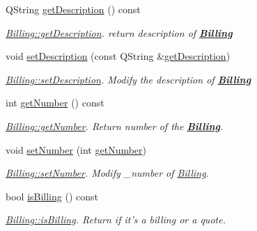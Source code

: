 \begin{DoxyCompactItemize}
Q\+String \hyperlink{classModels_1_1Billing_a5802215da8f4407457b8aeb7be525c65}{get\+Description} () const 
\begin{DoxyCompactList}\small\item\em \hyperlink{classModels_1_1Billing_a5802215da8f4407457b8aeb7be525c65}{Billing\+::get\+Description}. return description of {\bfseries \hyperlink{classModels_1_1Billing}{Billing}} \end{DoxyCompactList}\item 
void \hyperlink{classModels_1_1Billing_adb5cf4382150387f10bb6b774ace6bc8}{set\+Description} (const Q\+String \&\hyperlink{classModels_1_1Billing_a5802215da8f4407457b8aeb7be525c65}{get\+Description})
\begin{DoxyCompactList}\small\item\em \hyperlink{classModels_1_1Billing_adb5cf4382150387f10bb6b774ace6bc8}{Billing\+::set\+Description}. Modify the description of {\bfseries \hyperlink{classModels_1_1Billing}{Billing}} \end{DoxyCompactList}\item 
int \hyperlink{classModels_1_1Billing_a48c6e28a4aec13f8ed6b3ebbab837f0b}{get\+Number} () const 
\begin{DoxyCompactList}\small\item\em \hyperlink{classModels_1_1Billing_a48c6e28a4aec13f8ed6b3ebbab837f0b}{Billing\+::get\+Number}. Return number of the {\bfseries \hyperlink{classModels_1_1Billing}{Billing}}. \end{DoxyCompactList}\item 
void \hyperlink{classModels_1_1Billing_a2b43e0c657a9e717c9d2c091d222369e}{set\+Number} (int \hyperlink{classModels_1_1Billing_a48c6e28a4aec13f8ed6b3ebbab837f0b}{get\+Number})
\begin{DoxyCompactList}\small\item\em \hyperlink{classModels_1_1Billing_a2b43e0c657a9e717c9d2c091d222369e}{Billing\+::set\+Number}. Modify {\itshape \+\_\+number} of \hyperlink{classModels_1_1Billing}{Billing}. \end{DoxyCompactList}\item 
bool \hyperlink{classModels_1_1Billing_ab03dd29a9812a995355a1d93318f348f}{is\+Billing} () const 
\begin{DoxyCompactList}\small\item\em \hyperlink{classModels_1_1Billing_ab03dd29a9812a995355a1d93318f348f}{Billing\+::is\+Billing}. Return if it's a billing or a quote. \end{DoxyCompactList}\item 

\end{DoxyCompactItemize}
